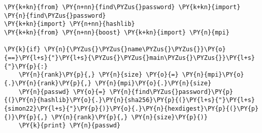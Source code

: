 \begin{Verbatim}[commandchars=\\\{\}]
\PY{k+kn}{from} \PY{n+nn}{find\PYZus{}password} \PY{k+kn}{import} \PY{n}{find\PYZus{}password}
\PY{k+kn}{import} \PY{n+nn}{hashlib}
\PY{k+kn}{from} \PY{n+nn}{boost} \PY{k+kn}{import} \PY{n}{mpi}

\PY{k}{if} \PY{n}{\PYZus{}\PYZus{}name\PYZus{}\PYZus{}}\PY{o}{==}\PY{l+s}{"}\PY{l+s}{\PYZus{}\PYZus{}main\PYZus{}\PYZus{}}\PY{l+s}{"}\PY{p}{:}
	\PY{n}{rank}\PY{p}{,} \PY{n}{size} \PY{o}{=} \PY{n}{mpi}\PY{o}{.}\PY{n}{rank}\PY{p}{,} \PY{n}{mpi}\PY{o}{.}\PY{n}{size}
	\PY{n}{passwd} \PY{o}{=} \PY{n}{find\PYZus{}password}\PY{p}{(}\PY{n}{hashlib}\PY{o}{.}\PY{n}{sha256}\PY{p}{(}\PY{l+s}{"}\PY{l+s}{simon22}\PY{l+s}{"}\PY{p}{)}\PY{o}{.}\PY{n}{hexdigest}\PY{p}{(}\PY{p}{)}\PY{p}{,} \PY{n}{rank}\PY{p}{,} \PY{n}{size}\PY{p}{)}
	\PY{k}{print} \PY{n}{passwd}
\end{Verbatim}
